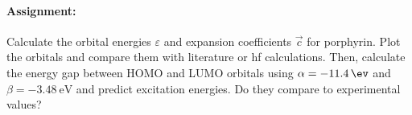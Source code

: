 \paragraph{Assignment:} Calculate the orbital energies $\varepsilon$ and expansion coefficients $\Vec{c}$ for porphyrin. Plot the orbitals and compare them with literature or \acrlong{hf} calculations. Then, calculate the energy gap between HOMO and LUMO orbitals using $\alpha = \SI{-11.4}{\ev}$ and $\beta = \SI{-3.48}{\eV}$ and predict excitation energies. Do they compare to experimental values?